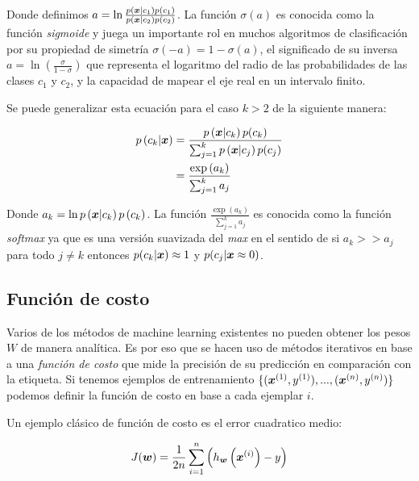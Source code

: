 Donde definimos $a = \ln \frac{p\left( \boldsymbol{x} | c_1 \right) p\left( c_1
\right)}{p\left( \boldsymbol{x} | c_2 \right) p\left( c_2 \right)}$. La función
$\sigma(a)$ es conocida como la función \emph{sigmoide} y juega un importante
rol en muchos algoritmos de clasificación por su propiedad de simetría
$\sigma(-a) = 1 - \sigma(a)$, el significado de su inversa $a = \ln \left(
\frac{\sigma}{1 - \sigma} \right)$ que representa el logaritmo del radio de las
probabilidades de las clases $c_1$ y $c_2$, y la capacidad de mapear el eje real
en un intervalo finito.

Se puede generalizar esta ecuación para el caso $k > 2$ de la siguiente manera:

\begin{align}
    p\left( c_k | \boldsymbol{x} \right) &= \frac{p\left( \boldsymbol{x} | c_k \right)p(c_k)}{
                                                \sum_{j=1}^{k} p\left( \boldsymbol{x} |
                                                c_j \right) p(c_j) } \\
                                       &= \frac{\exp\left( a_k \right)}{\sum_{j=1}^{k} a_j} \\
\end{align}

Donde $a_k = \ln p\left( \boldsymbol{x} | c_k \right) p\left( c_k \right)$. La función
$\frac{\exp\left( a_k \right)}{\sum_{j=1}^{k} a_j}$ es conocida como la función
\emph{softmax} ya que es una versión suavizada del \emph{max} en el sentido de
si $a_k >> a_j$ para todo $j \neq k$ entonces $p(c_k | \boldsymbol{x}) \approx 1$ y
$p(c_j | \boldsymbol{x} \approx 0)$.

\subsection{Función de costo}

Varios de los métodos de machine learning existentes no pueden obtener los pesos
$W$ de manera analítica. Es por eso que se hacen uso de métodos iterativos en
base a una \emph{función de costo} que mide la precisión de su predicción en
comparación con la etiqueta. Si tenemos ejemplos de entrenamiento
$\{(\boldsymbol{x}^{(1)}, y^{(1)}), ..., (\boldsymbol{x}^{(n)}, y^{(n)})\}$ podemos definir la
función de costo en base a cada ejemplar $i$.

Un ejemplo clásico de función de costo es el error cuadratico medio:

\begin{align}
    J(\boldsymbol{w}) = \frac{1}{2n} \sum_{i=1}^{n}\left( h_{\boldsymbol{w}}\left( \boldsymbol{x}^{(i)}\right) - y \right)
\end{align}

